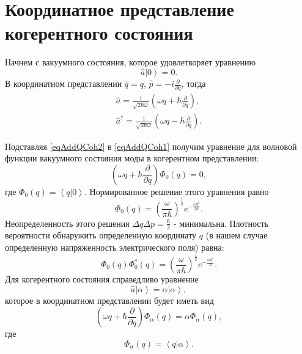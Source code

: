 \section{Координатное представление когерентного состояния}
\label{AddQCoh}
Начнем с вакуумного состояния, которое удовлетворяет уравнению 
\begin{equation}
\hat{a}\left|0\right> = 0.
\label{eqAddQCoh1}
\end{equation}
В координатном представлении $\hat{q} = q$, $\hat{p} = -i
\frac{\partial}{\partial q}$, тогда
\begin{eqnarray}
\hat{a} = \frac{1}{\sqrt{2 \hbar \omega}}
\left(
\omega q + \hbar \frac{\partial}{\partial q}
\right),
\nonumber \\
\hat{a}^{\dag} = \frac{1}{\sqrt{2 \hbar \omega}}
\left(
\omega q - \hbar \frac{\partial}{\partial q}
\right).
\label{eqAddQCoh2}
\end{eqnarray}

Подставляя \eqref{eqAddQCoh2} в \eqref{eqAddQCoh1} получим уравнение
для волновой функции вакуумного состояния моды в когерентном
представлении:
\begin{equation}
\left(
\omega q + \hbar \frac{\partial}{\partial q}
\right) \Phi_0\left(q\right) = 0,
\label{eqAddQCoh3}
\end{equation}
где $\Phi_0\left(q\right) = \left<q\right|\left.0\right>$.
Нормированное решение этого уравнения равно
\begin{equation}
\Phi_0\left(q\right) = \left(\frac{\omega}{\pi
  \hbar}\right)^{\frac{1}{4}} e^{-\frac{\omega q^2}{2 \hbar}}.
\nonumber
\end{equation}
Неопределенность этого решения $\Delta q \Delta p =
\frac{\hbar}{2}$ - минимальна. Плотность вероятности обнаружить
определенную координату $q$ (в нашем случае определенную напряженность
электрического поля) равна:
\begin{equation}
\Phi_0\left(q\right)\Phi_0^{*}\left(q\right) = \left(\frac{\omega}{\pi
  \hbar}\right)^{\frac{1}{2}} e^{-\frac{\omega q^2}{\hbar}}.
\label{eqAddQCoh4}
\end{equation}
Для когерентного состояния справедливо уравнение
\[
\hat{a}\left|\alpha\right> = \alpha \left|\alpha\right>,
\]
которое в координатном представлении будет иметь вид
\begin{equation}
\left(
\omega q + \hbar \frac{\partial}{\partial q}
\right) \Phi_{\alpha}\left(q\right) = 
\alpha \Phi_{\alpha}\left(q\right),
\label{eqAddQCoh5}
\end{equation}
где 
\[
\Phi_{\alpha}\left(q\right) = \left<q\right|\left.\alpha\right>.
\]

